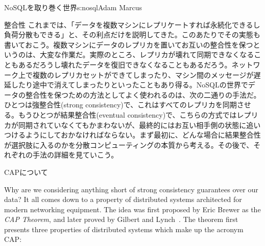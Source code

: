 \begin{aosachapter}{NoSQLを取り巻く世界}{s:nosql}{Adam Marcus}
\begin{aosasect1}{整合性}
これまでは、「データを複数マシンにレプリケートすれば永続化できるし負荷分散もできる」と、その利点だけを説明してきた。このあたりでその実態も書いておこう。複数マシンにデータのレプリカを置いてお互いの整合性を保つというのは、大変な作業だ。実際のところ、レプリカが壊れて同期できなくなることもあるだろうし壊れたデータを復旧できなくなることもあるだろう。ネットワーク上で複数のレプリカセットができてしまったり、マシン間のメッセージが遅延したり途中で消えてしまったりといったこともあり得る。NoSQLの世界でデータの整合性を保つための方法としてよく使われるのは、次の二通りの手法だ。ひとつは強整合性(strong consistency)で、これはすべてのレプリカを同期させる。もうひとつが結果整合性(eventual consistency)で、こちらの方式ではレプリカが同期されていなくてもかまわないが、最終的にはお互い相手側の状態に追いつけるようにしておかなければならない。まず最初に、どんな場合に結果整合性が選択肢に入るのかを分散コンピューティングの本質から考える。その後で、それぞれの手法の詳細を見ていこう。

\begin{aosasect2}{CAPについて}

Why are we considering anything short of strong consistency guarantees
over our data?  It all comes down to a property of distributed systems
architected for modern networking equipment.  The idea was first
proposed by Eric Brewer as the \emph{CAP Theorem}, and later proved by
Gilbert and Lynch~\cite{bib:captheorem}.  The theorem first presents three
properties of distributed systems which make up the acronym CAP:


\end{aosasect2}
\end{aosasect1}
\end{aosachapter}
